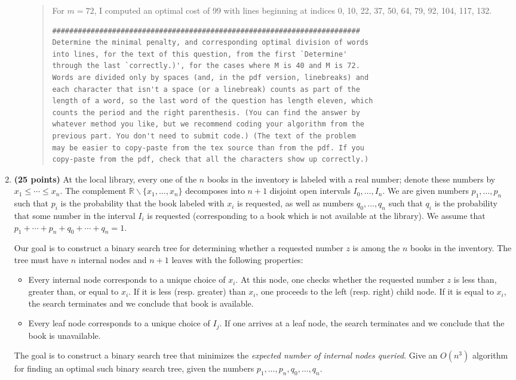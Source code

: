 \documentclass[11pt]{article}
\begin{document}
\begin{enumerate}
\begin{enumerate}
\begin{quote}
  \medskip
For $m = 72$, I computed an optimal cost of $99$ with lines beginning at indices 0, 10, 22, 37, 50, 64, 79, 92, 104, 117, 132. 
\begin{verbatim}
########################################################################
Determine the minimal penalty, and corresponding optimal division of words
into lines, for the text of this question, from the first `Determine'
through the last `correctly.)', for the cases where M is 40 and M is 72.
Words are divided only by spaces (and, in the pdf version, linebreaks) and
each character that isn't a space (or a linebreak) counts as part of the
length of a word, so the last word of the question has length eleven, which
counts the period and the right parenthesis. (You can find the answer by
whatever method you like, but we recommend coding your algorithm from the
previous part. You don't need to submit code.) (The text of the problem
may be easier to copy-paste from the tex source than from the pdf. If you
copy-paste from the pdf, check that all the characters show up correctly.)
\end{verbatim}
\end{quote}
\end{enumerate}

\item \textbf{(25 points)} At the local library, every one of the $n$ books in the inventory is labeled with a real number; denote these numbers by $x_1 \le \cdots \le x_n$. The complement $\mathbb{R}\backslash \{x_1,\ldots,x_n\}$ decomposes into $n+1$ disjoint open intervals $I_0,\ldots, I_n$. We are given numbers $p_1,\ldots,p_n$ such that $p_i$ is the probability that the book labeled with $x_i$ is requested, as well as numbers $q_0,\ldots,q_n$ such that $q_i$ is the probability that some number in the interval $I_i$ is requested (corresponding to a book which is not available at the library). We assume that $p_1 + \cdots + p_n + q_0 + \cdots + q_n = 1$.

Our goal is to construct a binary search tree for determining whether a requested number $z$ is among the $n$ books in the inventory. The tree must have $n$ internal nodes and $n + 1$ leaves with the following properties:
\begin{itemize}
    \item Every internal node corresponds to a unique choice of $x_i$. At this node, one checks whether the requested number $z$ is less than, greater than, or equal to $x_i$. If it is less (resp. greater) than $x_i$, one proceeds to the left (resp. right) child node. If it is equal to $x_i$, the search terminates and we conclude that book is available.
    \item Every leaf node corresponds to a unique choice of $I_j$. If one arrives at a leaf node, the search terminates and we conclude that the book is unavailable.
\end{itemize}
The goal is to construct a binary search tree that minimizes the \emph{expected number of internal nodes queried}. Give an $O(n^3)$ algorithm for finding an optimal such binary search tree, given the numbers $p_1,\ldots,p_n,q_0,\ldots,q_n$.


\end{enumerate}
\end{document}
